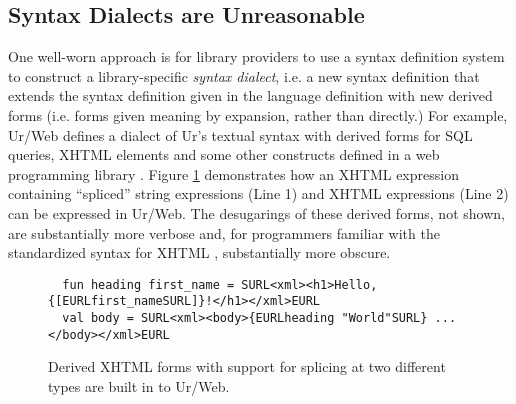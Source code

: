 \documentclass[acmlarge,review,anonymous]{acmart}\settopmatter{printfolios=true}
\begin{document}
\subsection{Syntax Dialects are Unreasonable}\label{sec:syntax-dialects-intro}
One well-worn approach is for library providers to use a syntax definition system to construct a library-specific \emph{syntax dialect}, i.e. a new syntax definition that extends the syntax definition given in the language definition with new derived forms (i.e. forms given meaning by expansion, rather than directly.) For example, Ur/Web defines a dialect of Ur's textual syntax with derived forms for SQL queries, XHTML elements and some other constructs defined in a  web programming library \cite{conf/popl/Chlipala15,conf/pldi/Chlipala10}. Figure \ref{fig:urweb} demonstrates how an XHTML expression containing ``spliced'' string expressions (Line 1) and XHTML expressions (Line 2) can be expressed in Ur/Web. 
The desugarings of these derived forms, not shown, are substantially more verbose and, for programmers familiar with the standardized syntax for XHTML \cite{xhtml}, substantially more obscure.

\begin{figure}
\begin{lstlisting}
  fun heading first_name = SURL<xml><h1>Hello, {[EURLfirst_nameSURL]}!</h1></xml>EURL
  val body = SURL<xml><body>{EURLheading "World"SURL} ...</body></xml>EURL
\end{lstlisting}
\vspace{-6px}
\caption{Derived XHTML forms with support for splicing at two different types are built in to Ur/Web.}
\vspace{-6px}
\label{fig:urweb}
\end{figure}
\end{document}
